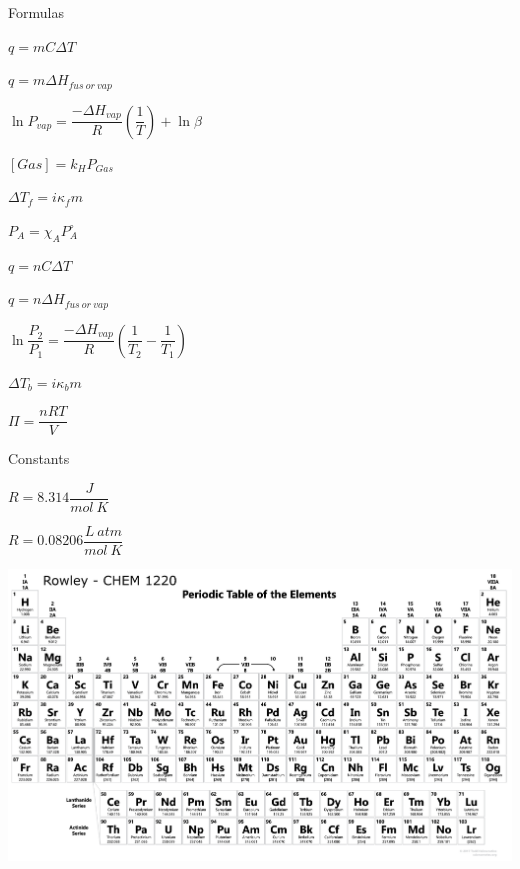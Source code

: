 \documentclass[12pt, letterpaper]{memoir}
\begin{document}
	\pagestyle{empty}
	{\large Formulas}
	
	\begin{minipage}{0.5\linewidth}
		$q=mC\Delta T$
		
		$q=m\Delta H_{fus~or~vap}$
		
		 $\ln P_{vap} = \dfrac{-\Delta H_{vap}}{R}\left(\dfrac{1}{T}\right) + \ln\beta$	 
		
		$[Gas]=k_HP_{Gas}$
		
		$\Delta T_f = i \kappa_f m$
		
		$P_{A}=\chi_AP^\circ_A$
	\end{minipage}
	\begin{minipage}{0.5\linewidth}
		$q=nC\Delta T$
		
		$q=n\Delta H_{fus~or~vap}$
		
		$\ln\dfrac{P_2}{P_1}=\dfrac{-\Delta H_{vap}}{R}\left(\dfrac{1}{T_2} - \dfrac{1}{T_1}\right)$	
		
		$\Delta T_b = i \kappa_b m$
		
		$\Pi=\dfrac{nRT}{V}$
	
	\end{minipage}
	
	\vspace{2em}

	{\large Constants}
	
	$R=8.314 \dfrac{J}{mol~K}$
	
	$R=0.08206 \dfrac{L~atm}{mol~K}$
	

	


\hspace{6em}	\includegraphics[width=1.3\textwidth, angle =90]{UpdatedTable}

	\restoregeometry

	
\end{document}
